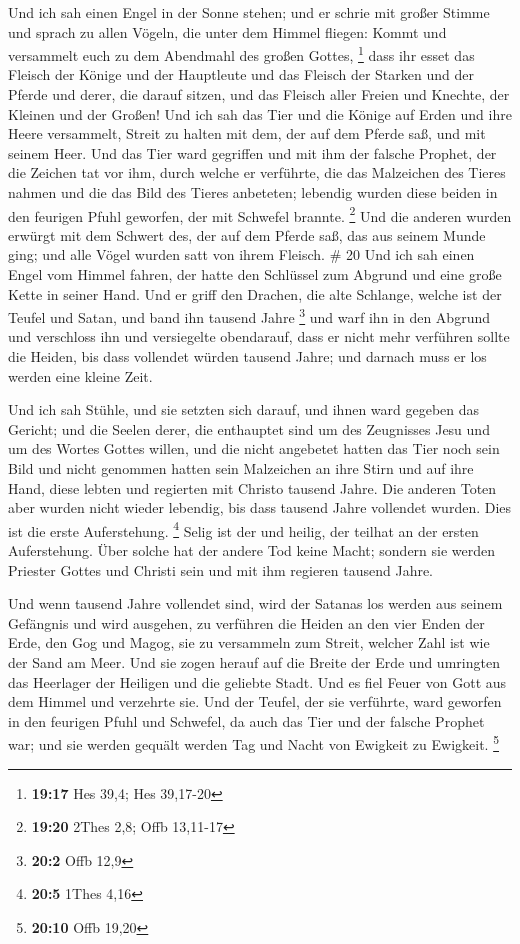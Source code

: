  Und ich sah einen Engel in der Sonne stehen; und er
schrie mit großer Stimme und sprach zu allen Vögeln, die unter dem
Himmel fliegen: Kommt und versammelt euch zu dem Abendmahl des großen
Gottes, \footnote{\textbf{19:17} Hes 39,4; Hes 39,17-20} 
dass ihr esset das Fleisch der Könige und der Hauptleute und das Fleisch
der Starken und der Pferde und derer, die darauf sitzen, und das Fleisch
aller Freien und Knechte, der Kleinen und der Großen! 
Und ich sah das Tier und die Könige auf Erden und ihre Heere versammelt,
Streit zu halten mit dem, der auf dem Pferde saß, und mit seinem Heer.
 Und das Tier ward gegriffen und mit ihm der falsche
Prophet, der die Zeichen tat vor ihm, durch welche er verführte, die das
Malzeichen des Tieres nahmen und die das Bild des Tieres anbeteten;
lebendig wurden diese beiden in den feurigen Pfuhl geworfen, der mit
Schwefel brannte. \footnote{\textbf{19:20} 2Thes 2,8; Offb 13,11-17}
 Und die anderen wurden erwürgt mit dem Schwert des, der
auf dem Pferde saß, das aus seinem Munde ging; und alle Vögel wurden
satt von ihrem Fleisch. \# 20  Und ich sah einen Engel vom
Himmel fahren, der hatte den Schlüssel zum Abgrund und eine große Kette
in seiner Hand.  Und er griff den Drachen, die alte
Schlange, welche ist der Teufel und Satan, und band ihn tausend Jahre
\footnote{\textbf{20:2} Offb 12,9}  und warf ihn in den
Abgrund und verschloss ihn und versiegelte obendarauf, dass er nicht
mehr verführen sollte die Heiden, bis dass vollendet würden tausend
Jahre; und darnach muss er los werden eine kleine Zeit.

 Und ich sah Stühle, und sie setzten sich darauf, und
ihnen ward gegeben das Gericht; und die Seelen derer, die enthauptet
sind um des Zeugnisses Jesu und um des Wortes Gottes willen, und die
nicht angebetet hatten das Tier noch sein Bild und nicht genommen hatten
sein Malzeichen an ihre Stirn und auf ihre Hand, diese lebten und
regierten mit Christo tausend Jahre.  Die anderen Toten
aber wurden nicht wieder lebendig, bis dass tausend Jahre vollendet
wurden. Dies ist die erste Auferstehung. \footnote{\textbf{20:5} 1Thes
  4,16}  Selig ist der und heilig, der teilhat an der
ersten Auferstehung. Über solche hat der andere Tod keine Macht; sondern
sie werden Priester Gottes und Christi sein und mit ihm regieren tausend
Jahre.

 Und wenn tausend Jahre vollendet sind, wird der Satanas
los werden aus seinem Gefängnis  und wird ausgehen, zu
verführen die Heiden an den vier Enden der Erde, den Gog und Magog, sie
zu versammeln zum Streit, welcher Zahl ist wie der Sand am Meer.
 Und sie zogen herauf auf die Breite der Erde und
umringten das Heerlager der Heiligen und die geliebte Stadt. Und es fiel
Feuer von Gott aus dem Himmel und verzehrte sie.  Und der
Teufel, der sie verführte, ward geworfen in den feurigen Pfuhl und
Schwefel, da auch das Tier und der falsche Prophet war; und sie werden
gequält werden Tag und Nacht von Ewigkeit zu Ewigkeit. \footnote{\textbf{20:10}
  Offb 19,20}

